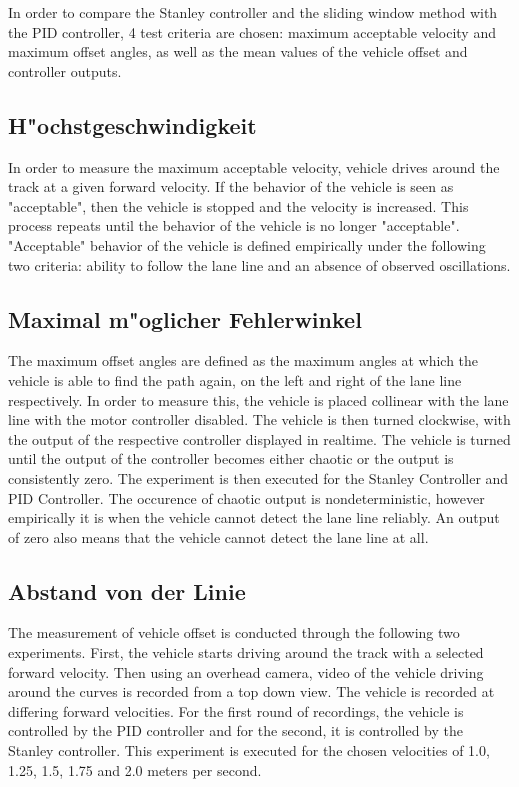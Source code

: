 \documentclass[arbeit=studie,oneside,BCOR=12mm]{ArbeitRST}
\begin{document}
In order to compare the Stanley controller and the sliding window method with
the PID controller, 4 test criteria are chosen: maximum acceptable velocity and
maximum offset angles, as well as the mean values of the vehicle
offset and controller outputs.

\subsection{H"ochstgeschwindigkeit}

In order to measure the maximum acceptable velocity, vehicle drives around the
track at a given forward velocity. If the behavior of the vehicle is seen as
"acceptable", then the vehicle is stopped and the velocity is increased. This
process repeats until the behavior of the vehicle is no longer "acceptable".
"Acceptable" behavior of the vehicle is defined empirically under the following
two criteria: ability to follow the lane line and an absence of observed
oscillations.

\subsection{Maximal m"oglicher Fehlerwinkel}

The maximum offset angles are defined as the maximum angles at which the
vehicle is able to find the path again, on the left and right of the lane line
respectively. In order to measure this, the vehicle is placed collinear with
the lane line with the motor controller disabled. The vehicle is then turned
clockwise, with the output of the respective controller displayed in realtime.
The vehicle is turned until the output of the controller becomes either chaotic
or the output is consistently zero. The experiment is then executed for the
Stanley Controller and PID Controller. The occurence of chaotic output is
nondeterministic, however empirically it is when the vehicle cannot detect the
lane line reliably. An output of zero also means that the vehicle cannot detect
the lane line at all.

\subsection{Abstand von der Linie}

The measurement of vehicle offset is conducted through the following two
experiments. First, the vehicle starts driving around the track with a selected
forward velocity. Then using an overhead camera, video of the vehicle driving
around the curves is recorded from a top down view. The vehicle is recorded at
differing forward velocities. For the first round of recordings, the vehicle is
controlled by the PID controller and for the second, it is controlled by the
Stanley controller. This experiment is executed for the chosen velocities
of 1.0, 1.25, 1.5, 1.75 and 2.0 meters per second.
\end{document}
